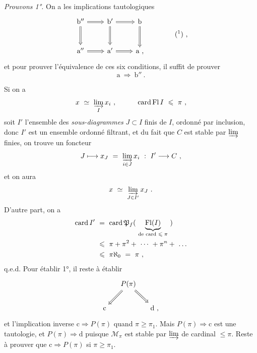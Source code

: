 \textit{Prouvons 1°.} On a les implications tautologiques
\[
\begin{tikzcd}[row sep=large]
\mathrm{b}'' \arrow[r, Rightarrow] \arrow[d, Rightarrow] & \mathrm{b}' \arrow[r, Rightarrow] \arrow[d, Rightarrow] & \mathrm{b} \arrow[d, Rightarrow] \\
\mathrm{a}'' \arrow[r, Rightarrow] & \mathrm{a}' \arrow[r, Rightarrow] & \mathrm{a} \text{ ,}
\end{tikzcd}
\qquad\qquad \text{(\footnotemark) ,}
\]
et pour prouver l'équivalence de ces six conditions, il suffit de prouver
\[ \mathrm{a} \ \Longrightarrow \ \mathrm{b}'' \ . \]


Si on a
\[ x \ \simeq \ \varinjlim_{I} x_i \ , \qquad\quad \operatorname{card} \operatorname{Fl} I \ \leqslant \ \pi \ , \]
soit $I'$ l'ensemble des \textit{sous-diagrammes} $J \subset I$ finis de $I$, ordonné par inclusion, donc $I'$ est un ensemble ordonné filtrant, et du fait que $C$ est stable par $\varinjlim$ finies, on trouve un foncteur
\[ J \longmapsto x_J \ = \ \varinjlim_{i\in J} x_i \ : \ I' \longrightarrow C \ , \]
et on aura
\[ x \ \simeq \ \varinjlim_{J\in I'} x_J \ . \]
D'autre part, on a
\[
\begin{aligned}
\card I' \ &= \ \card \mathfrak{P}_f( \ \underbrace{\Fl(I)}_{\text{de card $\leqslant \pi$}} \ ) \\
&\leqslant \ \pi + \pi^2 + \ \cdots \ + \pi^n + \ \dots \\
&\leqslant \ \pi\aleph_0 \ = \ \pi \ ,
\end{aligned}
\]
q.e.d. Pour établir 1°, il reste à établir
\[
\begin{tikzcd}[column sep=small]
& P(\pi) \arrow[dl, Rightarrow] \arrow[dr, Rightarrow] & \\
\mathrm{c} & & \mathrm{d} \text{ ,}
\end{tikzcd}
\]
et l'implication inverse $\mathrm{c} \Longrightarrow P(\pi)$ quand $\pi \geqslant \pi_1$. Mais $P(\pi) \Longrightarrow \mathrm{c}$ est une tautologie, et $P(\pi) \Longrightarrow \mathrm{d}$ puisque $\mathcal{M}_{\pi}$ est stable par $\varinjlim$ de cardinal $\leqslant \pi$. Reste à prouver que $\mathrm{c} \Longrightarrow P(\pi)$ si $\pi \geqslant \pi_1$.

